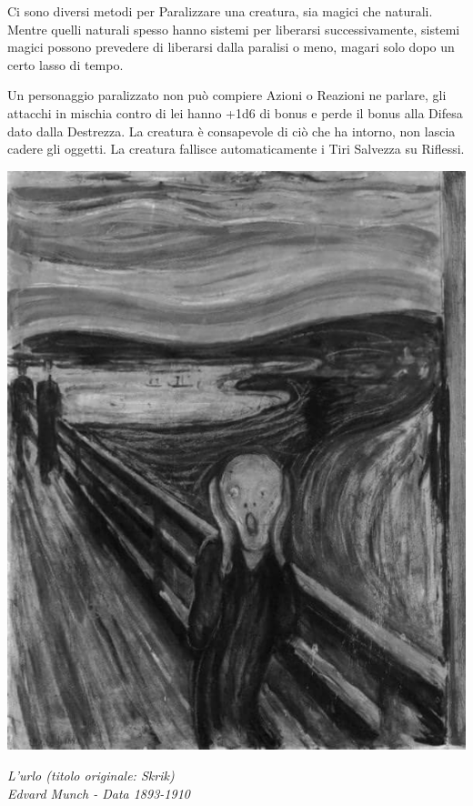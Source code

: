 \begin{multicols}{2}
Ci sono diversi metodi per Paralizzare una creatura, sia magici che naturali. Mentre quelli naturali spesso hanno sistemi per liberarsi successivamente, sistemi magici possono prevedere di liberarsi dalla paralisi o meno, magari solo dopo un certo lasso di tempo.

Un personaggio paralizzato non può compiere Azioni o Reazioni ne parlare, gli attacchi in mischia contro di lei hanno +1d6 di bonus e perde il bonus alla Difesa dato dalla Destrezza. La creatura è consapevole di ciò che ha intorno, non lascia cadere gli oggetti. La creatura fallisce automaticamente i Tiri Salvezza su Riflessi.

\end{multicols}

\vfill

\begin{center}
\includegraphics[width=0.45\linewidth]{immagini/the-scream.png}

\emph{L'urlo (titolo originale: Skrik)\\ Edvard Munch - Data 1893-1910}
\end{center}

\pagebreak

